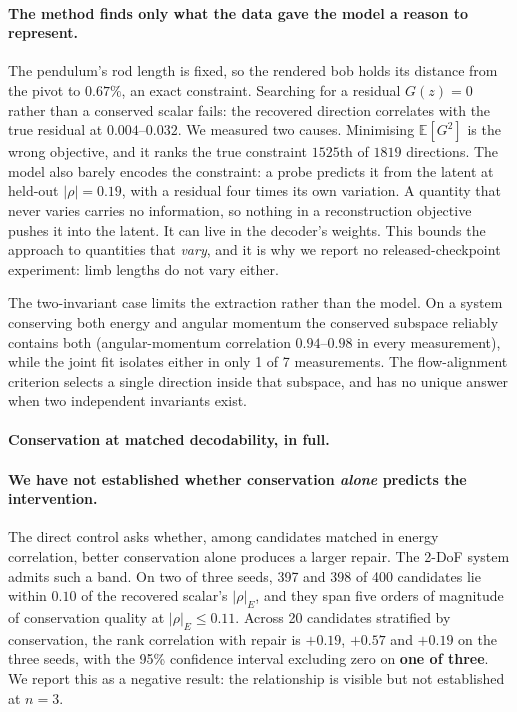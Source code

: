 \paragraph{The method finds only what the data gave the model a reason to represent.}
The pendulum's rod length is fixed, so the rendered bob holds its distance from the pivot to
$0.67\%$, an exact constraint. Searching for a residual $G(z)=0$ rather than a conserved scalar
fails: the recovered direction correlates with the true residual at $0.004$--$0.032$. We measured
two causes. Minimising $\mathbb{E}[G^2]$ is the wrong objective, and it ranks the true constraint
$1525$th of $1819$ directions. The model also barely encodes the constraint: a probe predicts it
from the latent at held-out $|\rho| = 0.19$, with a residual four times its own variation. A quantity
that never varies carries no information, so nothing in a reconstruction objective pushes it into the
latent. It can live in the decoder's weights. This bounds the approach to quantities that
\emph{vary}, and it is why we report no released-checkpoint experiment: limb lengths do not vary
either.

The two-invariant case limits the extraction rather than the model. On a system conserving both
energy and angular momentum the conserved subspace reliably contains both (angular-momentum
correlation $0.94$--$0.98$ in every measurement), while the joint fit isolates either in only 1 of 7
measurements. The flow-alignment criterion selects a single direction inside that subspace, and has
no unique answer when two independent invariants exist.


\paragraph{Conservation at matched decodability, in full.}
\paragraph{We have not established whether conservation \emph{alone} predicts the intervention.}
The direct control asks whether, among candidates matched in energy correlation, better conservation
alone produces a larger repair. The 2-DoF system admits such a band. On two of three seeds, 397 and
398 of 400 candidates lie within $0.10$ of the recovered scalar's $|\rho|_E$, and they span five
orders of magnitude of conservation quality at $|\rho|_E \le 0.11$. Across 20 candidates stratified
by conservation, the rank correlation with repair is $+0.19$, $+0.57$ and $+0.19$ on the three seeds,
with the 95\% confidence interval excluding zero on \textbf{one of three}. We report this as a
negative result: the relationship is visible but not established at $n = 3$.

